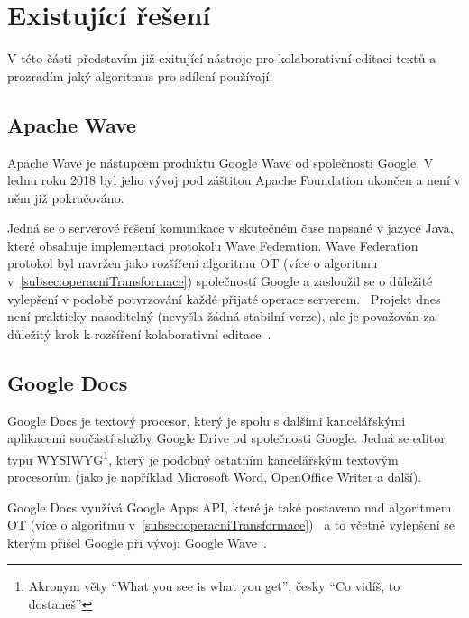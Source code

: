 
\section{Existující řešení}\label{sec:existujícíŘešení}
V této části představím již exitující nástroje pro kolaborativní editaci textů a prozradím jaký algoritmus pro sdílení používají.

\subsection{Apache Wave}\label{subsec:apacheWave}
Apache Wave je nástupcem produktu Google Wave od společnosti Google.
V lednu roku 2018 byl jeho vývoj pod záštitou Apache Foundation ukončen a není v něm již pokračováno.~\cite{wave:apache}

Jedná se o serverové řešení komunikace v skutečném čase napsané v jazyce Java, které obsahuje implementaci protokolu Wave Federation.
Wave Federation protokol byl navržen jako rozšíření algoritmu \gls{OT} (více o algoritmu v~\ref{subsec:operacniTransformace}) společností Google a zasloužil se o důležité vylepšení v podobě potvrzování každé přijaté operace serverem.~\cite{wave:apache, wave:google}
Projekt dnes není prakticky nasaditelný (nevyšla žádná stabilní verze), ale je považován za důležitý krok k rozšíření kolaborativní editace~\cite{ot:codecommit}.

\subsection{Google Docs}\label{subsec:googleDocs}
Google Docs je textový procesor, který je spolu s dalšími kancelářskými aplikacemi součástí služby Google Drive od společnosti Google.
Jedná se editor typu WYSIWYG\footnote{Akronym věty \enquote{What you see is what you get}, česky \enquote{Co vidíš, to dostaneš}}, který je podobný ostatním kancelářským textovým procesorům (jako je například Microsoft Word, OpenOffice Writer a další).~\cite{docs:top10}

Google Docs využívá Google Apps API, které je také postaveno nad algoritmem \gls{OT} (více o algoritmu v~\ref{subsec:operacniTransformace})~\cite{docs:conflict} a to včetně vylepšení se kterým přišel Google při vývoji Google Wave~\cite{docs:appsConf}.

